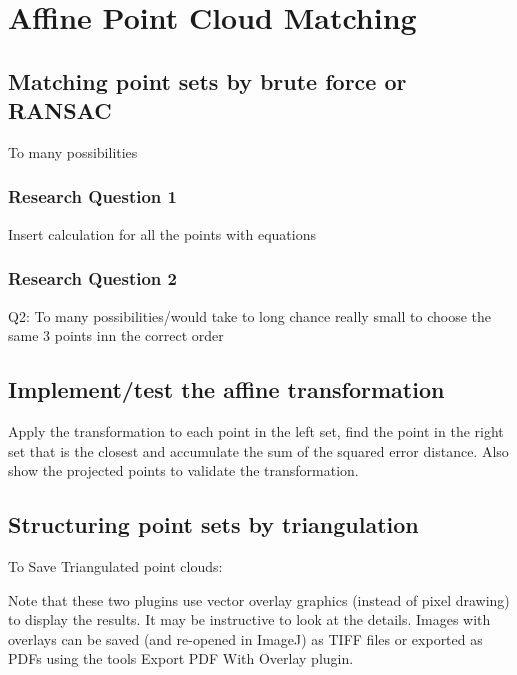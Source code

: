 \chapter{Affine Point Cloud Matching}


\section{Matching point sets by brute force or RANSAC}

To many possibilities

\subsection{Research Question 1}
Insert calculation for all the points with equations

\subsection{Research Question 2}
Q2: To many possibilities/would take to long chance really small to choose the same 3 points inn the correct order

\section{Implement/test the affine transformation}

Apply the transformation to each point in the left set, find the point in the right set that is the closest and accumulate the sum of the squared error distance. Also show the projected points to validate the transformation.

\section{Structuring point sets by triangulation}

To Save Triangulated point clouds:

Note that these two plugins use vector overlay graphics (instead of pixel drawing) to display the results. It may be instructive to look at the details. Images with overlays can be saved (and re-opened in ImageJ) as TIFF files or exported as PDFs using the
tools Export PDF With Overlay plugin.


